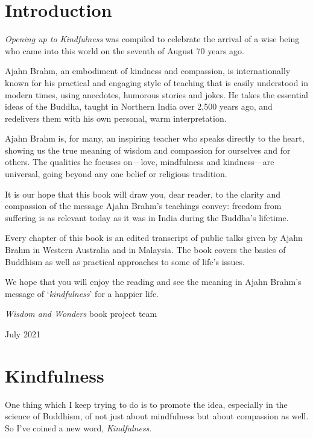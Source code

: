 \documentclass[12pt, openany]{book}
\begin{document}
\chapter{Introduction} 

\emph{Opening up to Kindfulness} was compiled to celebrate the arrival of a wise being who came into this world on the seventh of August 70 years ago. 

Ajahn Brahm, an embodiment of kindness and compassion, is internationally known for his practical and engaging style of teaching that is easily understood in modern times, using anecdotes, humorous stories and jokes. He takes the essential ideas of the Buddha, taught in Northern India over 2,500 years ago, and redelivers them with his own personal, warm interpretation. 

Ajahn Brahm is, for many, an inspiring teacher who speaks directly to the heart, showing us the true meaning of wisdom and compassion for ourselves and for others. The qualities he focuses on—love, mindfulness and kindness—are universal, going beyond any one belief or religious tradition. 

It is our hope that this book will draw you, dear reader, to the clarity and compassion of the message Ajahn Brahm’s teachings convey: freedom from suffering is as relevant today as it was in India during the Buddha’s lifetime. 

Every chapter of this book is an edited transcript of public talks given by Ajahn Brahm in Western Australia and in Malaysia. The book covers the basics of Buddhism as well as practical approaches to some of life’s issues. 

We hope that you will enjoy the reading and see the meaning in Ajahn Brahm’s message of ‘\emph{kindfulness}’ for a happier life. 


\medskip

\emph{Wisdom and Wonders} book project team 

July 2021 

\mainmatter

\pagestyle{fancy}

\chapter{Kindfulness} 

One thing which I keep trying to do is to promote the idea, especially in the science of Buddhism, of not just about mindfulness but about compassion as well. So I’ve coined a new word, \emph{Kindfulness}. 
\end{document}

